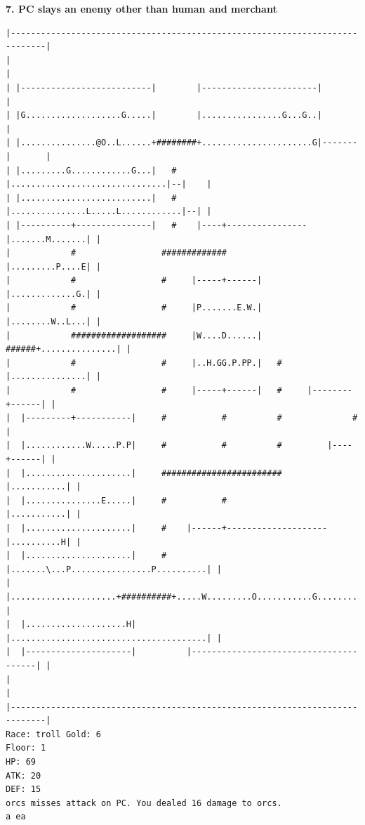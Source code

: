 \documentclass[11pt]{article}
\theoremstyle{plain}
\begin{document}
\newpage
\textbf{7. PC slays an enemy other than human and merchant}

\begin{Verbatim}[fontsize=\scriptsize]
|-----------------------------------------------------------------------------|
|                                                                             |
| |--------------------------|        |-----------------------|               |
| |G...................G.....|        |................G...G..|               |
| |...............@O..L......+########+......................G|-------|       |
| |.........G............G...|   #    |...............................|--|    |
| |..........................|   #    |...............L.....L............|--| |
| |----------+---------------|   #    |----+----------------|.......M.......| |
|            #                 #############                |.........P....E| |
|            #                 #     |-----+------|         |.............G.| |
|            #                 #     |P.......E.W.|         |........W..L...| |
|            ###################     |W....D......|   ######+...............| |
|            #                 #     |..H.GG.P.PP.|   #     |...............| |
|            #                 #     |-----+------|   #     |--------+------| |
|  |---------+-----------|     #           #          #              #        |
|  |............W.....P.P|     #           #          #         |----+------| |
|  |.....................|     ########################         |...........| |
|  |...............E.....|     #           #                    |...........| |
|  |.....................|     #    |------+--------------------|..........H| |
|  |.....................|     #    |.......\...P................P..........| |
|  |.....................+##########+.....W.........O...........G...........| |
|  |....................H|          |.......................................| |
|  |---------------------|          |---------------------------------------| |
|                                                                             |
|-----------------------------------------------------------------------------|
Race: troll Gold: 6                                                    Floor: 1
HP: 69
ATK: 20
DEF: 15
orcs misses attack on PC. You dealed 16 damage to orcs. 
a ea


\end{Verbatim}
\end{document}
